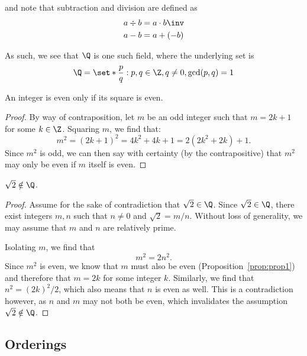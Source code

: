 \documentclass{article}
\begin{document}
and note that subtraction and division are defined as
\begin{align*}
  a \div b &= a \cdot b\inv\\
  a - b &= a + (-b)
\end{align*}

As such, we see that $\Q$ is one such field, where the underlying
set is
\begin{equation}
  \Q = \set*{\dfrac{p}{q} : p, q \in \Z, q \ne 0, \gcd(p, q) = 1}
\end{equation}

\begin{prop}\label{prop:prop1}
 An integer is even only if its square is even.
\end{prop}
\begin{proof}
  By way of contraposition, let $m$ be an odd integer such that
  $m = 2k+1$ for some $k \in \Z$. Squaring $m$, we find that:
  \begin{equation}
    m^{2} = {(2k + 1)}^{2} = 4k^{2} + 4k + 1 = 2(2k^{2} + 2k) + 1.
  \end{equation}
  Since $m^{2}$ is odd, we can then say with certainty (by the contrapositive)
  that $m^{2}$ may only be even if $m$ itself is even.
\end{proof}

\begin{thm}
  $\sqrt{2} \notin \Q$.
\end{thm}
\begin{proof}
  Assume for the sake of contradiction that $\sqrt{2} \in \Q$.
  Since $\sqrt{2} \in \Q$, there exist integers $m, n$ such that $n \ne 0$
  and $\sqrt{2} = m/n$. Without loss of generality, we may assume that
  $m$ and $n$ are relatively prime.

  Isolating $m$, we find that
  \begin{equation*}
    m^{2} = 2n^{2}.
  \end{equation*}
  Since $m^{2}$ is even, we know that $m$ must also be even (Proposition~\ref{prop:prop1})
  and therefore that $m = 2k$ for some integer $k$.
  Similarly, we find that $n^{2} = {(2k)}^{2}/2$, which
  also means that $n$ is even as well.
  This is a contradiction however, as $n$ and $m$ may not both be even, which
  invalidates the assumption $\sqrt{2} \notin \Q$.
\end{proof}

\subsection{Orderings}
\end{document}
